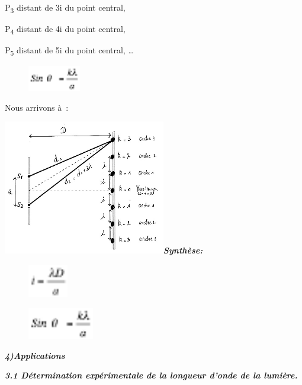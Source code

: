 P\textsubscript{3} distant de 3i du point central,

P\textsubscript{4} distant de 4i du point central,

P\textsubscript{5} distant de 5i du point central, \ldots{}

\begin{figure}
\centering
\includegraphics[width=2.306cm,height=1.107cm]{Pictures/100000010000002C0000001558E0CCA95D4F59EB.png}
\caption{}
\end{figure}

Nous arrivons à~:

\includegraphics[width=7.086cm,height=5.897cm]{Pictures/100000010000020C000001B4676C159EC881E6E3.png}\emph{\textbf{Synthèse:}}

\begin{figure}
\centering
\includegraphics[width=1.757cm,height=1.432cm]{Pictures/100000010000001A000000159D382765312EA964.png}
\caption{}
\end{figure}

\begin{figure}
\centering
\includegraphics[width=2.894cm,height=1.389cm]{Pictures/100000010000002C0000001558E0CCA95D4F59EB.png}
\caption{}
\end{figure}

\emph{\textbf{4)Applications}}

\emph{\textbf{3.1 Détermination expérimentale de la longueur d'onde de
la lumière. }}

